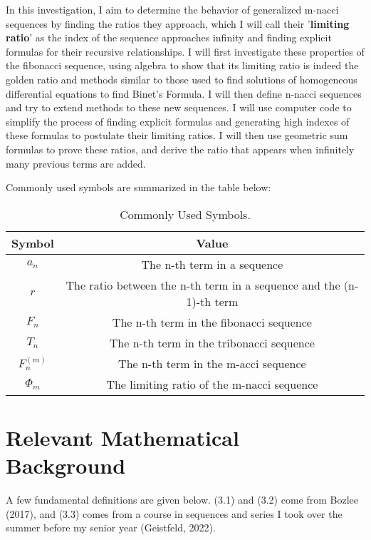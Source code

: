 \documentclass[11pt]{article}
\begin{document}
In this investigation, I aim to determine the behavior of generalized m-nacci sequences by finding the ratios they approach, which I will call their '\textbf{limiting ratio}’ as the index of the sequence approaches infinity and finding explicit formulas for their recursive relationships. I will first investigate these properties of the fibonacci sequence, using algebra to show that its limiting ratio is indeed the golden ratio and methods similar to those used to find solutions of homogeneous differential equations to find Binet’s Formula. I will then define n-nacci sequences and try to extend methods to these new sequences. I will use computer code to simplify the process of finding explicit formulas and generating high indexes of these formulas to postulate their limiting ratios. I will then use geometric sum formulas to prove these ratios, and derive the ratio that appears when infinitely many previous terms are added. 

\noindent Commonly used symbols are summarized in the table below:

\begin{table}[h]
\begin{center}
    \begin{tabular}{ |c|c| } 
    \hline
    \textbf{Symbol} & \textbf{Value} \\
    \hline
    $a_n$ & The n-th term in a sequence \\ 
    \hline
    $r$ & The ratio between the n-th term in a sequence and the (n-1)-th term \\ 
    \hline
    $F_n$ & The n-th term in the fibonacci sequence \\
    \hline
    $T_n$ & The n-th term in the tribonacci sequence \\
    \hline
    $F^{(m)}_n$ & The n-th term in the m-acci sequence \\ 
    \hline
    $\Phi_m$ & The limiting ratio of the m-nacci sequence \\
    \hline
    \end{tabular}
    \caption{Commonly Used Symbols.}
\label{table:1}
\end{center}
\end{table}

\section{Relevant Mathematical Background}
A few fundamental definitions are given below. (3.1) and (3.2) come from Bozlee (2017), and (3.3) comes from a course in sequences and series I took over the summer before my senior year (Geistfeld, 2022).
\end{document}
